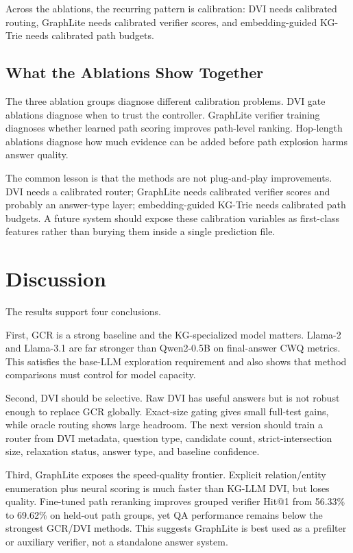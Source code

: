 \documentclass[10pt,twocolumn]{article}
\begin{document}
Across the ablations, the recurring pattern is calibration: DVI needs calibrated routing, GraphLite needs calibrated verifier scores, and embedding-guided KG-Trie needs calibrated path budgets.


\subsection{What the Ablations Show Together}
The three ablation groups diagnose different calibration problems. DVI gate ablations diagnose when to trust the controller. GraphLite verifier training diagnoses whether learned path scoring improves path-level ranking. Hop-length ablations diagnose how much evidence can be added before path explosion harms answer quality.

The common lesson is that the methods are not plug-and-play improvements. DVI needs a calibrated router; GraphLite needs calibrated verifier scores and probably an answer-type layer; embedding-guided KG-Trie needs calibrated path budgets. A future system should expose these calibration variables as first-class features rather than burying them inside a single prediction file.

\section{Discussion}
The results support four conclusions.

First, GCR is a strong baseline and the KG-specialized model matters. Llama-2 and Llama-3.1 are far stronger than Qwen2-0.5B on final-answer CWQ metrics. This satisfies the base-LLM exploration requirement and also shows that method comparisons must control for model capacity.

Second, DVI should be selective. Raw DVI has useful answers but is not robust enough to replace GCR globally. Exact-size gating gives small full-test gains, while oracle routing shows large headroom. The next version should train a router from DVI metadata, question type, candidate count, strict-intersection size, relaxation status, answer type, and baseline confidence.

Third, GraphLite exposes the speed-quality frontier. Explicit relation/entity enumeration plus neural scoring is much faster than KG-LLM DVI, but loses quality. Fine-tuned path reranking improves grouped verifier Hit@1 from 56.33\% to 69.62\% on held-out path groups, yet QA performance remains below the strongest GCR/DVI methods. This suggests GraphLite is best used as a prefilter or auxiliary verifier, not a standalone answer system.
\end{document}
